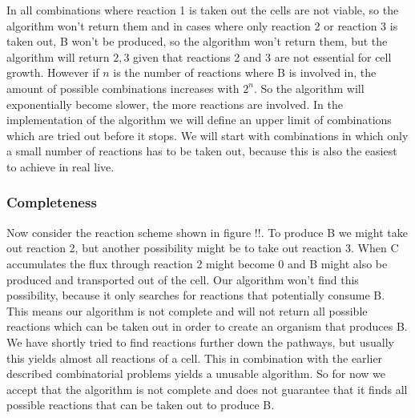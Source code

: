 \documentclass[10pt]{report}
\begin{document}
In all combinations where reaction 1 is taken out the cells are not viable, so the algorithm won't return them and in cases where only reaction 2 or reaction 3 is taken out, B won't be produced, so the algorithm won't return them, but the algorithm will return ${2,3}$ given that reactions 2 and 3 are not essential for cell growth.
However if $n$ is the number of reactions where B is involved in, the amount of possible combinations increases with $2^n$.
So the algorithm will exponentially become slower, the more reactions are involved.
In the implementation of the algorithm we will define an upper limit of combinations which are tried out before it stops. We will start with combinations in which only a small number of reactions has to be taken out, because this is also the easiest to achieve in real live.

\subsubsection{Completeness}
Now consider the reaction scheme shown in figure !!. To produce B we might take out reaction 2, but another possibility might be to take out reaction 3. When C accumulates the flux through reaction 2 might become 0 and B might also be produced and transported out of the cell. Our algorithm won't find this possibility, because it only searches for reactions that potentially consume B. This means our algorithm is not complete and will not return all possible reactions which can be taken out in order to create an organism that produces B. We have shortly tried to find reactions further down the pathways, but usually this yields almost all reactions of a cell. This in combination with the earlier described combinatorial problems yields a unusable algorithm. So for now we accept that the algorithm is not complete and does not guarantee that it finds all possible reactions that can be taken out to produce B.
\end{document}
